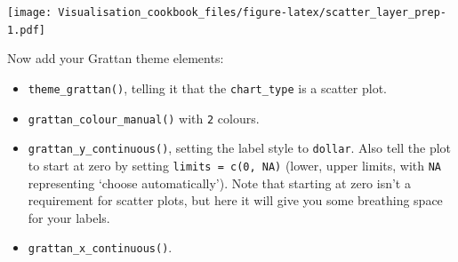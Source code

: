 \documentclass[]{book}
\newenvironment{Shaded}{\begin{snugshade}}{\end{snugshade}}
\newcommand{\DataTypeTok}[1]{\textcolor[rgb]{0.13,0.29,0.53}{#1}}
\newcommand{\DecValTok}[1]{\textcolor[rgb]{0.00,0.00,0.81}{#1}}
\newcommand{\FloatTok}[1]{\textcolor[rgb]{0.00,0.00,0.81}{#1}}
\newcommand{\KeywordTok}[1]{\textcolor[rgb]{0.13,0.29,0.53}{\textbf{#1}}}
\newcommand{\NormalTok}[1]{#1}
\newcommand{\OperatorTok}[1]{\textcolor[rgb]{0.81,0.36,0.00}{\textbf{#1}}}
\newcommand{\OtherTok}[1]{\textcolor[rgb]{0.56,0.35,0.01}{#1}}
\newcommand{\StringTok}[1]{\textcolor[rgb]{0.31,0.60,0.02}{#1}}
\providecommand{\tightlist}{%
  \setlength{\itemsep}{0pt}\setlength{\parskip}{0pt}}
\begin{document}
\begin{Shaded}
\end{Shaded}

\texttt{[image: Visualisation\_cookbook\_files/figure-latex/scatter\_layer\_prep-1.pdf]}

Now add your Grattan theme elements:

\begin{itemize}
\tightlist
\item
  \texttt{theme\_grattan()}, telling it that the \texttt{chart\_type} is a scatter plot.
\item
  \texttt{grattan\_colour\_manual()} with \texttt{2} colours.
\item
  \texttt{grattan\_y\_continuous()}, setting the label style to \texttt{dollar}. Also tell the plot to start at zero by setting \texttt{limits\ =\ c(0,\ NA)} (lower, upper limits, with \texttt{NA} representing `choose automatically'). Note that starting at zero isn't a requirement for scatter plots, but here it will give you some breathing space for your labels.
\item
  \texttt{grattan\_x\_continuous()}.
\end{itemize}

\begin{Shaded}
\end{Shaded}
\end{document}
